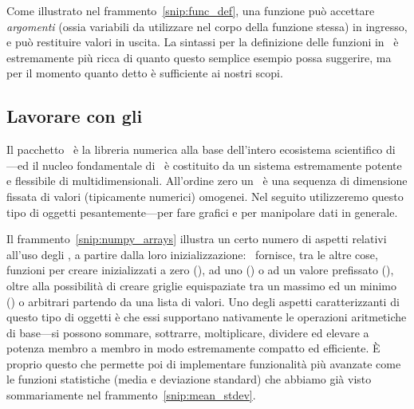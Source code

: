 \begin{snippet}[htb!]
  \bigskip %
\end{snippet}

Come illustrato nel frammento~\ref{snip:func_def}, una funzione può accettare
\emph{argomenti} (ossia variabili da utilizzare nel corpo della funzione stessa)
in ingresso, e può restituire valori in uscita. La sintassi per la
definizione delle funzioni in \python\ è estremamente più ricca di quanto
questo semplice esempio possa suggerire, ma per il momento quanto detto è
sufficiente ai nostri scopi.


\subsection{Lavorare con gli \nparray}

Il pacchetto \numpy\ è la libreria numerica alla base dell'intero
ecosistema scientifico di \python---ed il nucleo fondamentale di \numpy\
è costituito da un sistema estremamente potente e flessibile di 
multidimensionali. All'ordine zero un \nparray\ è una sequenza di
dimensione fissata di valori (tipicamente numerici) omogenei. Nel seguito
utilizzeremo questo tipo di oggetti pesantemente---per fare grafici e per
manipolare dati in generale.

Il frammento~\ref{snip:numpy_arrays} illustra un certo numero di aspetti
relativi all'uso degli \nparray, a partire dalla loro inizializzazione:
\numpy\ fornisce, tra le altre cose, funzioni per creare \foreign{array}
inizializzati a zero (\npfunc{zeros}), ad uno (\npfunc{ones}) o
ad un valore prefissato (), oltre alla possibilità di
creare griglie equispaziate tra un massimo ed un minimo ()
o \foreign{array} arbitrari partendo da una lista di valori.
Uno degli aspetti caratterizzanti di questo tipo di oggetti è che essi
supportano nativamente le operazioni aritmetiche di base---si possono sommare,
sottrarre, moltiplicare, dividere ed elevare a potenza membro a membro in modo
estremamente compatto ed efficiente. \`E proprio questo che permette poi di
implementare funzionalità più avanzate come le funzioni statistiche
(media e deviazione standard) che abbiamo già visto sommariamente nel
frammento~\ref{snip:mean_stdev}.

